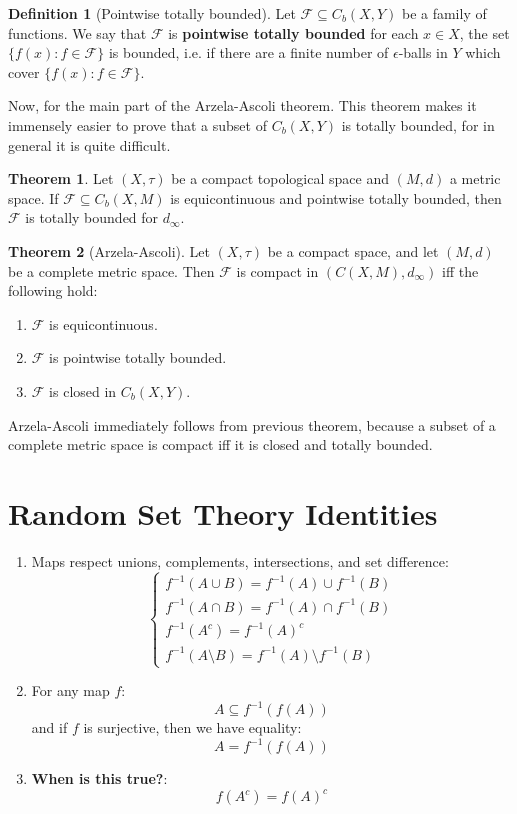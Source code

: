 \documentclass[11pt, oneside]{amsart}   	%
\theoremstyle{definition}
\newtheorem{definition}{Definition}[section]
\newtheorem{theorem}{Theorem}[section]
\begin{document}
	\begin{definition}[Pointwise totally bounded]
		Let $\mathcal F\subseteq C_b(X, Y)$ be a family of functions. We say that $\mathcal F$ is \textbf{pointwise 
		totally bounded} for each $x\in X$, the set $\{f(x) : f\in\mathcal F\}$ is bounded, i.e. if there are a finite 
		number of $\epsilon$-balls in $Y$ which cover $\{f(x) : f\in\mathcal F\}$.
	\end{definition}
	
	Now, for the main part of the Arzela-Ascoli theorem. This theorem makes it immensely easier to prove that a 
	subset of $C_b(X, Y)$ is totally bounded, for in general it is quite difficult.
	
	\begin{theorem}
		Let $(X, \tau)$ be a compact topological space and $(M, d)$ a metric space. If $\mathcal F\subseteq C_b(X, M)$ 
		is equicontinuous and pointwise totally bounded, then $\mathcal F$ is totally bounded for $d_\infty$.
	\end{theorem}
	
	\begin{theorem}[Arzela-Ascoli]
		Let $(X, \tau)$ be a compact space, and let $(M, d)$ be a complete metric space. Then $\mathcal F$ is compact in
		$(C(X, M), d_\infty)$ iff the following hold:
		\begin{enumerate}
			\item $\mathcal F$ is equicontinuous.
			\item $\mathcal F$ is pointwise totally bounded.
			\item $\mathcal F$ is closed in $C_b(X, Y)$.
		\end{enumerate}
	\end{theorem}
	
	Arzela-Ascoli immediately follows from previous theorem, because a subset of a complete metric space is compact iff it is 
	closed and totally bounded.

\newpage

\section{Random Set Theory Identities}

	\begin{enumerate}
		\item Maps respect unions, complements, intersections, and set difference:
		$$
			\begin{cases}
				f^{-1}(A\cup B) = f^{-1}(A)\cup f^{-1}(B) \\
				f^{-1}(A\cap B) = f^{-1}(A)\cap f^{-1}(B) \\
				f^{-1}(A^c) = f^{-1}(A)^c \\
				f^{-1}(A\setminus B) = f^{-1}(A)\setminus f^{-1}(B)
			\end{cases}
		$$
		\item For any map $f$:
		$$
			A\subseteq f^{-1}(f(A))
		$$
		and if $f$ is surjective, then we have equality:
		$$
			A = f^{-1}(f(A))
		$$
		\item \textbf{When is this true?}:
		$$
			f(A^c) = f(A)^c
		$$
	\end{enumerate}
\end{document}

